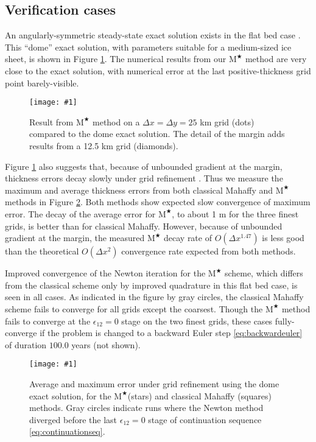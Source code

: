 \documentclass[twocolumn,a4paper]{igs}
\newcommand{\onecol}[1]{\texttt{[image: \#1]}}
\newcommand\eps{\epsilon}
\newcommand{\Mstar}{$\text{M}^{\bigstar}$\xspace}
\begin{document}
\subsection{Verification cases}

An angularly-symmetric steady-state exact solution exists in the flat bed case \citep{Bueler2003,vanderVeen2013}.  This ``dome'' exact solution, with parameters suitable for a medium-sized ice sheet, is shown in Figure \ref{fig:domeprofile}.  The numerical results from our \Mstar method are very close to the exact solution, with numerical error at the last positive-thickness grid point barely-visible.

\begin{figure}[ht]
\onecol{domeprofile.pdf}
\caption{Result from \Mstar method on a $\Delta x=\Delta y=25$ km grid (dots) compared to the dome exact solution.  The detail of the margin adds results from a 12.5 km grid  (diamonds).}
\label{fig:domeprofile}
\end{figure}

Figure \ref{fig:domeprofile} also suggests that, because of unbounded gradient at the margin, thickness errors decay slowly under grid refinement \citep{Bueleretal2005}.  Thus we measure the maximum and average thickness errors from both classical Mahaffy and \Mstar methods in Figure \ref{fig:domeverif}.  Both methods show expected slow convergence of maximum error.  The decay of the average error for \Mstar, to about 1 m for the three finest grids, is better than for classical Mahaffy.  However, because of unbounded gradient at the margin, the measured \Mstar decay rate of $O(\Delta x^{1.47})$ is less good than the theoretical $O(\Delta x^2)$ convergence rate expected from both methods.

Improved convergence of the Newton iteration for the \Mstar scheme, which differs from the classical scheme only by improved quadrature in this flat bed case, is seen in all cases.  As indicated in the figure by gray circles, the classical Mahaffy scheme fails to converge for all grids except the coarsest.  Though the \Mstar method fails to converge at the $\eps_{12}=0$ stage on the two finest grids, these cases fully-converge if the problem is changed to a backward Euler step \eqref{eq:backwardeuler} of duration $100.0$ years (not shown).

\begin{figure}[ht]
\onecol{domeverif.pdf}
\caption{Average and maximum error under grid refinement using the dome exact solution, for the \Mstar (stars) and classical Mahaffy (squares) methods.  Gray circles indicate runs where the Newton method diverged before the last $\eps_{12}=0$ stage of continuation sequence \eqref{eq:continuationseq}.}
\label{fig:domeverif}
\end{figure}
\end{document}

